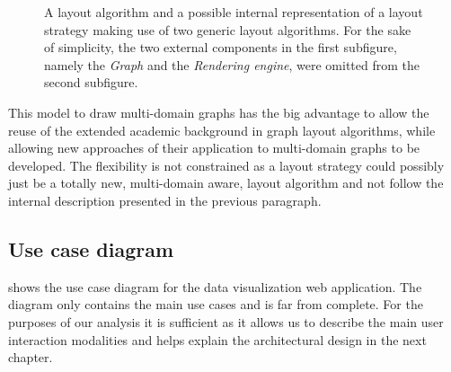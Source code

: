 \begin{figure}
  \begin{adjustwidth}{-0.25mm}{-0.6mm}
  \end{adjustwidth}

  \begin{adjustwidth}{-5mm}{-4.7mm}
  \end{adjustwidth}
  \caption[The components of the Strategy/Layout model.]{A layout algorithm and a possible internal representation of a layout strategy making use of two generic layout algorithms. For the sake of simplicity, the two external components in the first subfigure, namely the \emph{Graph} and the \emph{Rendering engine}, were omitted from the second subfigure.}
  \label{fig:layout-strategy}
\end{figure}

This model to draw multi-domain graphs has the big advantage to allow the reuse of the extended academic background in graph layout algorithms, while allowing new approaches of their application to multi-domain graphs to be developed. The flexibility is not constrained as a layout strategy could possibly just be a totally new, multi-domain aware, layout algorithm and not follow the internal description presented in the previous paragraph.

\subsection{Use case diagram}

 shows the use case diagram for the data visualization web application. The diagram only contains the main use cases and is far from complete. For the purposes of our analysis it is sufficient as it allows us to describe the main user interaction modalities and helps explain the architectural design in the next chapter.


